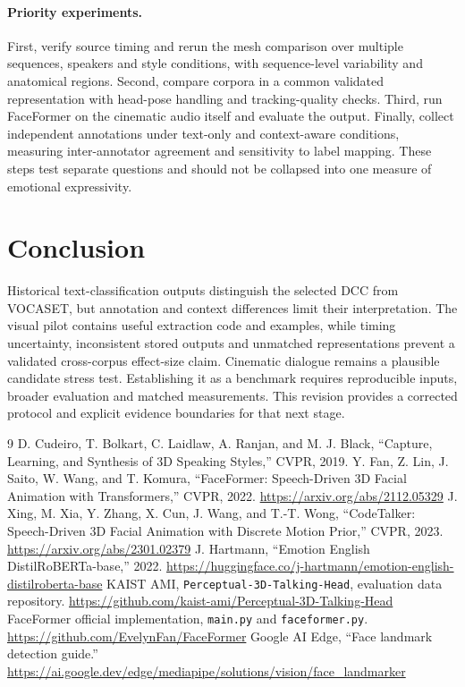 \documentclass[10pt]{article}
\begin{document}
\paragraph{Priority experiments.}
First, verify source timing and rerun the mesh comparison over multiple sequences,
speakers and style conditions, with sequence-level variability and anatomical
regions. Second, compare corpora in a common validated representation with head-pose
handling and tracking-quality checks. Third, run FaceFormer on the cinematic audio
itself and evaluate the output. Finally, collect independent annotations under
text-only and context-aware conditions, measuring inter-annotator agreement and
sensitivity to label mapping. These steps test separate questions and should not
be collapsed into one measure of emotional expressivity.

\section{Conclusion}
Historical text-classification outputs distinguish the selected DCC from VOCASET,
but annotation and context differences limit their interpretation. The visual pilot
contains useful extraction code and examples, while timing uncertainty, inconsistent
stored outputs and unmatched representations prevent a validated cross-corpus
effect-size claim. Cinematic dialogue remains a plausible candidate stress test.
Establishing it as a benchmark requires reproducible inputs, broader evaluation and
matched measurements. This revision provides a corrected protocol and explicit
evidence boundaries for that next stage.

\begin{thebibliography}{9}
D. Cudeiro, T. Bolkart, C. Laidlaw, A. Ranjan, and M. J. Black,
``Capture, Learning, and Synthesis of 3D Speaking Styles,'' CVPR, 2019.
Y. Fan, Z. Lin, J. Saito, W. Wang, and T. Komura,
``FaceFormer: Speech-Driven 3D Facial Animation with Transformers,'' CVPR, 2022.
\url{https://arxiv.org/abs/2112.05329}
J. Xing, M. Xia, Y. Zhang, X. Cun, J. Wang, and T.-T. Wong,
``CodeTalker: Speech-Driven 3D Facial Animation with Discrete Motion Prior,'' CVPR, 2023.
\url{https://arxiv.org/abs/2301.02379}
J. Hartmann, ``Emotion English DistilRoBERTa-base,'' 2022.
\url{https://huggingface.co/j-hartmann/emotion-english-distilroberta-base}
KAIST AMI, \texttt{Perceptual-3D-Talking-Head}, evaluation data repository.
\url{https://github.com/kaist-ami/Perceptual-3D-Talking-Head}
FaceFormer official implementation, \texttt{main.py} and \texttt{faceformer.py}.
\url{https://github.com/EvelynFan/FaceFormer}
Google AI Edge, ``Face landmark detection guide.''
\url{https://ai.google.dev/edge/mediapipe/solutions/vision/face_landmarker}
\end{thebibliography}
\end{document}
